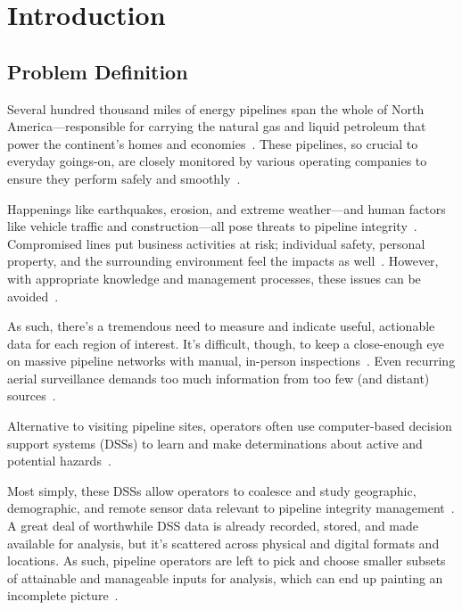 \chapter{Introduction}
\label{intro}

\section{Problem Definition}
\label{Problem}
Several hundred thousand miles of energy pipelines span the whole of North America---responsible for carrying the natural gas and liquid petroleum that power the continent's homes and economies~\cite{PHMSA}. These pipelines, so crucial to everyday goings-on, are closely monitored by various operating companies to ensure they perform safely and smoothly~\cite{PHMSA2013}.

Happenings like earthquakes, erosion, and extreme weather---and human factors like vehicle traffic and construction---all pose threats to pipeline integrity~\cite{MichaelBakerJr.2008,Chastain,Dunning2013}. Compromised lines put business activities at risk; individual safety, personal property, and the surrounding environment feel the impacts as well~\cite{Dunning2013}. However, with appropriate knowledge and management processes, these issues can be avoided~\cite{Dunning2013,Chastain}.

As such, there's a tremendous need to measure and indicate useful, actionable data for each region of interest. It's difficult, though, to keep a close-enough eye on massive pipeline networks with manual, in-person inspections~\cite{Dunning2013,Chastain}. Even recurring aerial surveillance demands too much information from too few (and distant) sources~\cite{Dunning2013}.

Alternative to visiting pipeline sites, operators often use computer-based decision support systems (DSSs) to learn and make determinations about active and potential hazards~\cite{PHMSA2013,Dunning2013}. 

Most simply, these DSSs allow operators to coalesce and study geographic, demographic, and remote sensor data relevant to pipeline integrity management~\cite{RedlandsSDSS,Dunning2013}. A great deal of worthwhile DSS data is already recorded, stored, and made available for analysis, but it's scattered across physical and digital formats and locations. As such, pipeline operators are left to pick and choose smaller subsets of attainable and manageable inputs for analysis, which can end up painting an incomplete picture~\cite{Dunning2013}.

